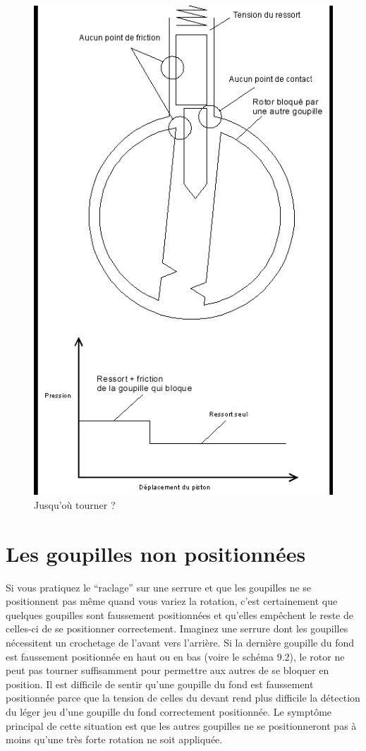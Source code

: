 \documentclass[a4paper,french,11pt,twoside]{report}
\begin{document}
\begin{figure}[h] \begin{center}
        \includegraphics[scale=0.5]{images/Image19}
        \caption{Jusqu'où tourner ?}
\end{center} \end{figure}


\section{Les goupilles non positionnées}

Si vous pratiquez le \enquote{raclage} sur une serrure et que les goupilles ne se positionnent pas même quand vous variez la rotation, c'est certainement que quelques goupilles sont faussement positionnées et qu'elles empêchent le reste de celles-ci de se positionner correctement. Imaginez une serrure dont les goupilles nécessitent un crochetage de l'avant vers l'arrière. Si la dernière goupille du fond est faussement positionnée en haut ou en bas (voire le schéma 9.2), le rotor ne peut pas tourner suffisamment pour permettre aux autres de se bloquer en position. Il est difficile de sentir qu'une goupille du fond est faussement positionnée parce que la tension de celles du devant rend plus difficile la détection du léger jeu d'une goupille du fond correctement positionnée. Le symptôme principal de cette situation est que les autres goupilles ne se positionneront pas à moins qu'une très forte rotation ne soit appliquée.
\end{document}
